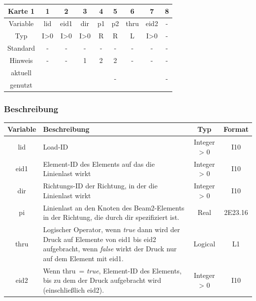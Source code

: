 \documentclass[11pt,titlepage,listof=totoc,bibliography=totoc,twoside]{scrreprt}
\begin{document}
{{\begin{table}[htbp]
\centering
\begin{tabularx}{\textwidth}{cCCCCCCCC}
\toprule
Karte 1	& 1		& 2		& 3		& 4		& 5		& 6		& 7		& 8	\\
\midrule
Variable& lid		& eid1		& dir		& p1		& p2		& thru		& eid2		& -	\\
Typ	& I>0		& I>0		& I>0		& R		& R		& L		& I>0		& -	\\
Standard& -		& -		& -		& -		& -		& -		& -		& -	\\
Hinweis	& -		& -		& 1		& 2		& 2		& -		& -		& -	\\
aktuell	& 	& 	& 	& 	& 	& 	& 	& 	\\
genutzt \\
\bottomrule
\end{tabularx}
\end{table}

\subsubsection{Beschreibung}

\begin{tabularx}{\textwidth}{cXcc}
\toprule
Variable& Beschreibung												& Typ			& Format\\
\midrule
lid	& Load-ID												& Integer > 0	& I10	\\
eid1	& Element-ID des Elements auf das die Linienlast wirkt							& Integer > 0	& I10	\\
dir	& Richtungs-ID der Richtung, in der die Linienlast wirkt						& Integer > 0	& I10	\\
pi	& Linienlast an den Knoten des Beam2-Elements in der Richtung, die durch dir spezifiziert ist.		& Real		& 2E23.16\\
thru	& Logischer Operator, wenn \emph{true} dann wird der Druck auf Elemente von eid1 bis eid2 aufgebracht, wenn \emph{false} wirkt der Druck nur auf dem Element mit eid1.	& Logical	& L1	\\
eid2	& Wenn thru~= \emph{true}, Element-ID des Elements, bis zu dem der Druck aufgebracht wird (einschließlich eid2).	& Integer > 0	& I10	\\
\bottomrule
\end{tabularx}

}}
\end{document}
